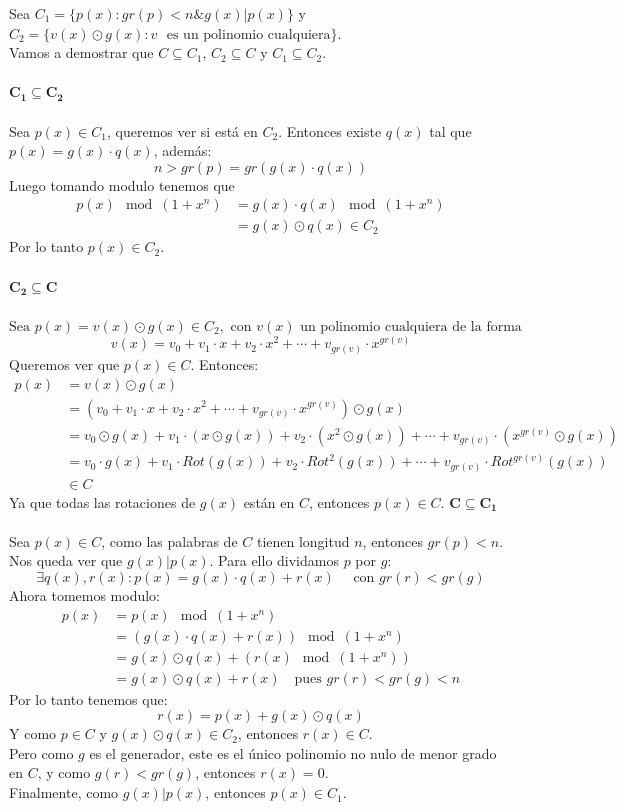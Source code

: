 \documentclass[11pt, a4paper]{article}
\theoremstyle{definition}
\begin{document}
Sea $C_1 = \{p(x) : gr(p) < n\&g(x)|p(x)\}$ y $C_2 = \{v(x) \odot g(x): v \text{ } \text{es un polinomio cualquiera} \}$.\\ 
Vamos a demostrar que $C \subseteq C_1$, $C_2 \subseteq C$ y $C_1 \subseteq C_2$.\\ \\
$\boldsymbol{C_1 \subseteq C_2}$\\ \\
Sea $p(x) \in C_1$, queremos ver si está en $C_2$. Entonces existe $q(x)$ tal que $p(x) = g(x) \cdot q(x)$, además:
\[
n > gr(p) = gr(g(x) \cdot q(x)) 
\]
Luego tomando modulo tenemos que 
\begin{align*}
    p(x) \mod (1 + x^n) &= g(x) \cdot q(x) \mod (1 + x^n) \\
                        &= g(x) \odot q(x) \in C_2  
\end{align*} 
Por lo tanto $p(x) \in C_2$.\\ \\
$\boldsymbol{C_2 \subseteq C}$\\ \\
$\text{Sea } p(x) = v(x) \odot g(x) \in C_2, \text{ con } v(x) \text{ un polinomio cualquiera de la forma}$
\[
v(x) = v_0 + v_1 \cdot x + v_2 \cdot x^2 + \cdots + v_{gr(v)} \cdot x^{gr(v)}
\]
Queremos ver que $p(x) \in C$. Entonces:
\begin{align*}
    p(x) &= v(x) \odot g(x) \\
    &= (v_0 + v_1 \cdot x + v_2 \cdot x^2 + \cdots + v_{gr(v)} \cdot x^{gr(v)}) \odot g(x) \\
    &= v_0 \odot g(x) + v_1 \cdot (x \odot g(x)) + v_2 \cdot (x^2 \odot g(x)) + \cdots + v_{gr(v)} \cdot (x^{gr(v)} \odot g(x)) \\
    &= v_0 \cdot g(x) + v_1 \cdot Rot(g(x)) + v_2 \cdot Rot^2(g(x)) + \cdots + v_{gr(v)} \cdot Rot^{gr(v)}(g(x)) \\
    &\in C
\end{align*}  
Ya que todas las rotaciones de $g(x)$ están en $C$, entonces $p(x) \in C$.
\newpage
$\boldsymbol{C \subseteq C_1}$\\ \\
Sea $p(x) \in C$, como las palabras de $C$ tienen longitud $n$, entonces $gr(p) < n$. Nos queda ver que $g(x)|p(x)$. Para ello dividamos $p$ por $g$:
\[
\exists q(x), r(x) : p(x) = g(x) \cdot q(x) + r(x) \quad \text{ con } gr(r) < gr(g)
\]
Ahora tomemos modulo:
\begin{align*}
    p(x) &= p(x) \mod (1 + x^n) \\
         &= (g(x) \cdot q(x) + r(x)) \mod (1 + x^n) \\
         &= g(x) \odot q(x) + (r(x) \mod (1 + x^n)) \\
         &= g(x) \odot q(x) + r(x) \quad \text{pues } gr(r) < gr(g) < n
\end{align*}
Por lo tanto tenemos que:
\[
r(x) = p(x) + g(x) \odot q(x)
\]
Y como $p \in C$ y $g(x) \odot q(x) \in C_2$, entonces $r(x) \in C$.\\
Pero como $g$ es el generador, este es el único polinomio no nulo de menor grado en $C$, y como $g(r) < gr(g)$, entonces $r(x) = 0$.\\
Finalmente, como $g(x)|p(x)$, entonces $p(x) \in C_1$.
\end{document}
